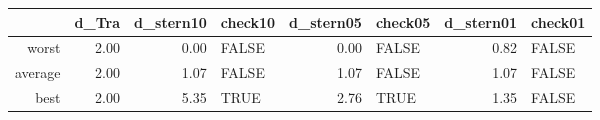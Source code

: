 \begin{tabular}{rrrlrlrl}
  \toprule
 & d\_Tra & d\_stern10 & check10 & d\_stern05 & check05 & d\_stern01 & check01 \\ 
  \midrule
worst & 2.00 & 0.00 & FALSE & 0.00 & FALSE & 0.82 & FALSE \\ 
  average & 2.00 & 1.07 & FALSE & 1.07 & FALSE & 1.07 & FALSE \\ 
  best & 2.00 & 5.35 & TRUE & 2.76 & TRUE & 1.35 & FALSE \\ 
   \bottomrule
\end{tabular}
